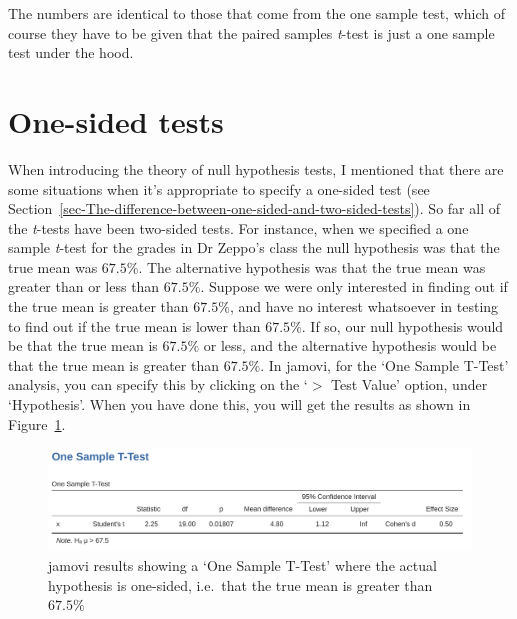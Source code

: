 \documentclass[
  a4paper,
]{book}
\begin{document}
The numbers are identical to those that come from the one sample test,
which of course they have to be given that the paired samples
\emph{t}-test is just a one sample test under the hood.

\hypertarget{one-sided-tests}{%
\section{One-sided tests}\label{one-sided-tests}}

When introducing the theory of null hypothesis tests, I mentioned that
there are some situations when it's appropriate to specify a one-sided
test (see
Section~\ref{sec-The-difference-between-one-sided-and-two-sided-tests}).
So far all of the \emph{t}-tests have been two-sided tests. For
instance, when we specified a one sample \emph{t}-test for the grades in
Dr Zeppo's class the null hypothesis was that the true mean was
\(67.5\%\). The alternative hypothesis was that the true mean was
greater than or less than \(67.5\%\). Suppose we were only interested in
finding out if the true mean is greater than \(67.5\%\), and have no
interest whatsoever in testing to find out if the true mean is lower
than \(67.5\%\). If so, our null hypothesis would be that the true mean
is \(67.5\%\) or less, and the alternative hypothesis would be that the
true mean is greater than \(67.5\%\). In jamovi, for the `One Sample
T-Test' analysis, you can specify this by clicking on the `\(>\) Test
Value' option, under `Hypothesis'. When you have done this, you will get
the results as shown in Figure~\ref{fig-fig11-17}.

\begin{figure}

\includegraphics[width=1\textwidth,height=\textheight]{images/fig11-17.png} \hfill{}

\caption{\label{fig-fig11-17}jamovi results showing a `One Sample
T-Test' where the actual hypothesis is one-sided, i.e.~that the true
mean is greater than \(67.5\%\)}

\end{figure}
\end{document}
